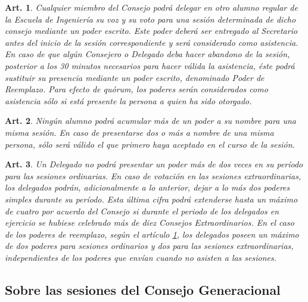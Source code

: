 \documentclass[letterpaper,11pt]{article}
\theoremstyle{plain}
\newtheorem{art}{Art.} %
\begin{document}
			\begin{art}\label{definicionPoder}
				Cualquier miembro del Consejo podrá delegar en otro alumno regular de la Escuela de Ingeniería su voz y su voto para una sesión determinada de dicho consejo mediante un poder escrito. Este poder deberá ser entregado al Secretario antes del inicio de la sesión correspondiente y será considerado como asistencia. En caso de que algún Consejero o Delegado deba hacer abandono de la sesión, posterior a los 30 minutos necesarios para hacer válida la asistencia, éste podrá sustituir su presencia mediante un poder escrito, denominado Poder de Reemplazo. Para efecto de quórum, los poderes serán considerados como asistencia sólo si está presente la persona a quien ha sido otorgado.
			\end{art}

			\begin{art}\label{maxPoderesRecividos}
				Ningún alumno podrá acumular más de un poder a su nombre para una misma sesión. En caso de presentarse dos o más a nombre de una misma persona, sólo será válido el que primero haya aceptado en el curso de la sesión.
			\end{art}

			\begin{art}\label{maxPoderesEmitidos}
				Un Delegado no podrá presentar un poder más de dos veces en su período para las sesiones ordinarias. En caso de votación en las sesiones extraordinarias, los delegados podrán, adicionalmente a lo anterior, dejar a lo más dos poderes simples durante su período. Esta última cifra podrá extenderse hasta un máximo de cuatro por acuerdo del Consejo si durante el periodo de los delegados en ejercicio se hubiese celebrado más de diez Consejos Extraordinarios. En el caso de los poderes de reemplazo, según el artículo \ref{definicionPoder}, los delegados poseen un máximo de dos poderes para sesiones ordinarios y dos para las sesiones extraordinarias, independientes de los poderes que envían cuando no asisten a las sesiones.
			\end{art}

		\subsection*{Sobre las sesiones del Consejo Generacional}
\end{document}

